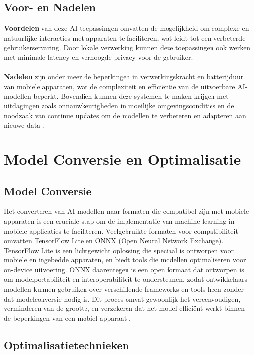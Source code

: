 \subsection{Voor- en Nadelen}

\textbf{Voordelen} van deze AI-toepassingen omvatten de mogelijkheid om complexe en natuurlijke interacties met apparaten te faciliteren, wat leidt tot een verbeterde gebruikerservaring. Door lokale verwerking kunnen deze toepassingen ook werken met minimale latency en verhoogde privacy voor de gebruiker.
\\ \\
\textbf{Nadelen} zijn onder meer de beperkingen in verwerkingskracht en batterijduur van mobiele apparaten, wat de complexiteit en efficiëntie van de uitvoerbare AI-modellen beperkt. Bovendien kunnen deze systemen te maken krijgen met uitdagingen zoals onnauwkeurigheden in moeilijke omgevingscondities en de noodzaak van continue updates om de modellen te verbeteren en adapteren aan nieuwe data \autocite{Castanyer2021}.


\section{Model Conversie en Optimalisatie}

\subsection{Model Conversie}

Het converteren van AI-modellen naar formaten die compatibel zijn met mobiele apparaten is een cruciale stap om de implementatie van machine learning in mobiele applicaties te faciliteren. Veelgebruikte formaten voor compatibiliteit omvatten TensorFlow Lite en ONNX (Open Neural Network Exchange). TensorFlow Lite is een lichtgewicht oplossing die speciaal is ontworpen voor mobiele en ingebedde apparaten, en biedt tools die modellen optimaliseren voor on-device uitvoering. ONNX daarentegen is een open formaat dat ontworpen is om modelportabiliteit en interoperabiliteit te ondersteunen, zodat ontwikkelaars modellen kunnen gebruiken over verschillende frameworks en tools heen zonder dat modelconversie nodig is. Dit proces omvat gewoonlijk het vereenvoudigen, verminderen van de grootte, en verzekeren dat het model efficiënt werkt binnen de beperkingen van een mobiel apparaat \autocite{Dalwadi2021}.

\subsection{Optimalisatietechnieken}

